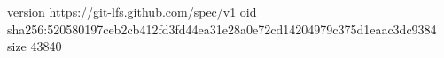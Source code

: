 version https://git-lfs.github.com/spec/v1
oid sha256:520580197ceb2cb412fd3fd44ea31e28a0e72cd14204979c375d1eaac3dc9384
size 43840
